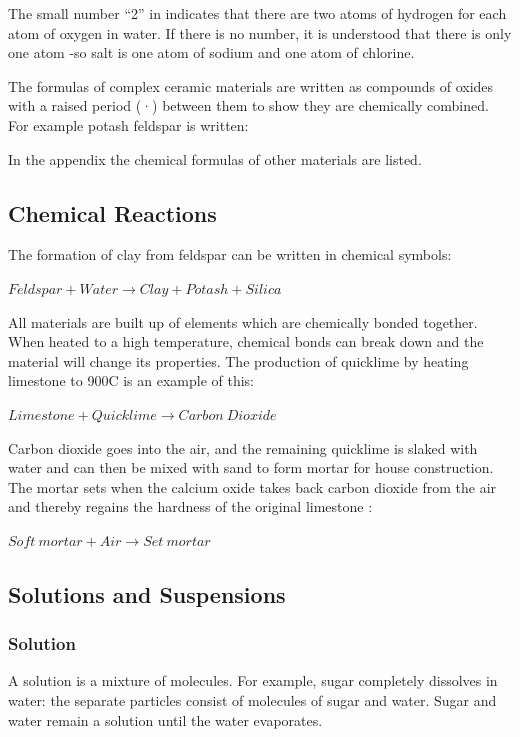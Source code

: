 The small number ``2'' in  indicates that there are two atoms of 
hydrogen 
for each atom of oxygen in water. If there is no number, it is understood that 
there is only one atom -so salt is one atom of sodium and one atom of chlorine.

The formulas of complex ceramic materials are written as compounds of oxides 
with a raised period (·) between them to show they are chemically combined. For 
example potash feldspar is written:


In the appendix the chemical formulas of other materials are listed.
\subsection{Chemical Reactions}
The formation of clay from feldspar can be written in chemical symbols:


$Feldspar + Water \rightarrow Clay + Potash + Silica$

All materials are built up of elements which are chemically bonded together. 
When heated to a high temperature, chemical bonds can break down and the 
material will change its properties. The production of quicklime by heating 
limestone to 900\degree C is an example of this:


$Limestone + Quicklime \rightarrow Carbon~Dioxide$

Carbon dioxide  goes into the air, and the remaining quicklime 
 is slaked with water and can then be mixed with sand to form mortar 
for house construction. The mortar sets when the calcium oxide  takes 
back carbon dioxide  from the air and thereby regains the hardness of 
the original limestone :



$Soft~mortar + Air \rightarrow Set~mortar$
\subsection{Solutions and Suspensions}
\subsubsection{Solution}
A solution is a mixture of molecules. For example, sugar completely dissolves 
in water: the separate particles consist of molecules of sugar and water. Sugar 
and water remain a solution until the water evaporates.

